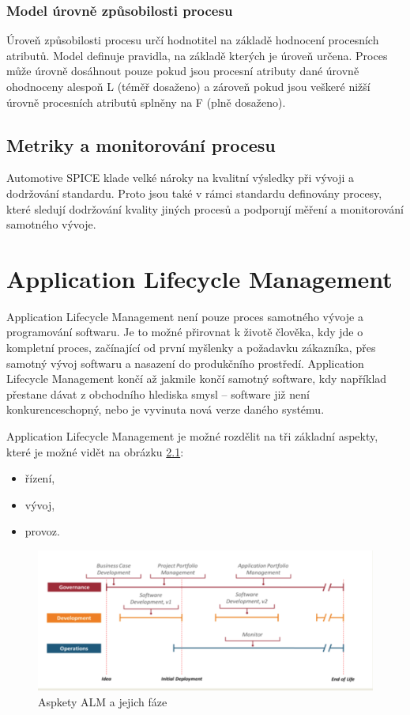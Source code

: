 \documentclass[czech,master]{diploma}
\begin{document}
\subsection{Model úrovně způsobilosti procesu}
Úroveň způsobilosti procesu určí hodnotitel na základě hodnocení procesních atributů. Model definuje  pravidla, na základě kterých je úroveň určena. Proces může úrovně dosáhnout pouze pokud jsou procesní atributy dané úrovně ohodnoceny alespoň L (téměř dosaženo) a zároveň pokud jsou veškeré nižší úrovně procesních atributů splněny na F (plně dosaženo).


\section{Metriky a monitorování procesu}
Automotive SPICE klade velké nároky na kvalitní výsledky při vývoji a dodržování standardu. Proto jsou také v rámci standardu definovány procesy, které sledují dodržování kvality jiných procesů a podporují měření a monitorování samotného vývoje.



\chapter{Application Lifecycle Management}
\label{sec:alm}
Application Lifecycle Management není pouze proces samotného vývoje a programování softwaru. Je to možné přirovnat k životě člověka, kdy jde o kompletní proces, začínající od první myšlenky a požadavku zákazníka, přes samotný vývoj softwaru a nasazení do produkčního prostředí. Application Lifecycle Management končí až jakmile končí samotný software, kdy například přestane dávat z obchodního hlediska smysl -- software již není konkurenceschopný, nebo je vyvinuta nová verze daného systému. \cite{alm_chappell}

Application Lifecycle Management je možné rozdělit na tři základní aspekty, které je možné vidět na obrázku \ref{fig:alm}:

\begin{itemize}
  \item řízení,
  \item vývoj,
  \item provoz.
\end{itemize}

\begin{figure}[!ht]
    \centering
    \includegraphics[width=1\textwidth]{Diplomka/Figures/alm.png}
    \caption{Aspkety ALM a jejich fáze \cite{alm_chappell}}
    \label{fig:alm}
\end{figure}
\end{document}
